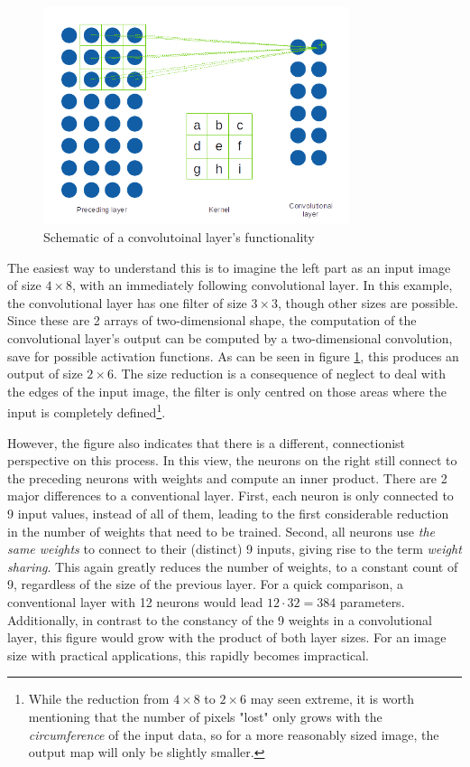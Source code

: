 \documentclass[11pt, a4paper]{article}
\begin{document}
\begin{figure}[htp]
	\centering
	\includegraphics[width=0.8\textwidth]{images/convolution_layer.png}
	\caption{Schematic of a convolutoinal layer's functionality}
	\label{fig:convolutional-layer}
\end{figure}

The easiest way to understand this is to imagine the left part as an input image of size $4 \times 8$, with an immediately following convolutional layer. In this example, the convolutional layer has one filter of size $3 \times 3$, though other sizes are possible. Since these are 2 arrays of two-dimensional shape, the computation of the convolutional layer's output can be computed by a two-dimensional convolution, save for possible activation functions. As can be seen in figure \ref{fig:convolutional-layer}, this produces an output of size $2 \times 6$. The size reduction is a consequence of neglect to deal with the edges of the input image, the filter is only centred on those areas where the input is completely defined\footnote{While the reduction from $4 \times 8$ to $2 \times 6$ may seen extreme, it is worth mentioning that the number of pixels "lost" only grows with the \emph{circumference} of the input data, so for a more reasonably sized image, the output map will only be slightly smaller.}.

However, the figure also indicates that there is a different, connectionist perspective on this process. In this view, the neurons on the right still connect to the preceding neurons with weights and compute an inner product. There are 2 major differences to a conventional layer. First, each neuron is only connected to 9 input values, instead of all of them, leading to the first considerable reduction in the number of weights that need to be trained. Second, all neurons use \emph{the same weights} to connect to their (distinct) 9 inputs, giving rise to the term \emph{weight sharing}. This again greatly reduces the number of weights, to a constant count of 9, regardless of the size of the previous layer. For a quick comparison, a conventional layer with 12 neurons would lead $12 \cdot 32 = 384$ parameters. Additionally, in contrast to the constancy of the 9 weights in a convolutional layer, this figure would grow with the product of both layer sizes. For an image size with practical applications, this rapidly becomes impractical.
\end{document}
